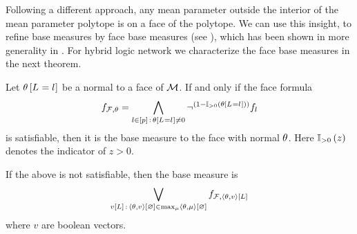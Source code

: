 Following a different approach, any mean parameter outside the interior of the mean parameter polytope is on a face of the polytope.
We can use this insight, to refine base measures by face base measures (see ), which has been shown in more generality in .
For hybrid logic network we characterize the face base measures in the next theorem.


\begin{theorem}\label{the:hlnFaceBaseMeasureCharacterization}
	Let $\theta\left[L_{}=l_{}\right]$ be a normal to a face of $\mathcal{M}$.
	If and only if the face formula
		\[ f_{\mathcal{F},\theta} = \bigwedge_{l\in[p] \, : \, \theta\left[L_{}=l_{}\right]\neq0} \lnot^{(1-\mathbb{I}_{>0}\left(\theta\left[L_{}=l_{}\right]\right))} f_{l}  \]
	is satisfiable, then it is the base measure to the face with normal $\theta$.
	Here $\mathbb{I}_{>0}\left(z\right)$ denotes the indicator of $z>0$.

	If the above is not satisfiable, then the base measure is
		\[ \bigvee_{v[L] \, : \, \left\langle \theta,v\right\rangle \left[ \varnothing \right] \in \max_{\mu} \left\langle \theta,\mu\right\rangle \left[ \varnothing \right] }  f_{\mathcal{F},\left\langle \theta,v\right\rangle \left[ L \right]}  \]
	where $v$ are boolean vectors.
\end{theorem}
